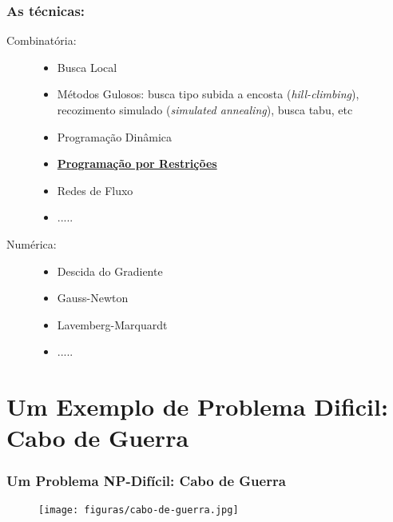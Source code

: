 \documentclass{beamer}
\begin{document}
\begin{frame}[fragile]
 \frametitle{As técnicas:} 
  
\begin{block}{}
      \begin{description}
      \item[Combinatória:]
      \begin{itemize}
           \item Busca Local
          \item Métodos Gulosos: busca tipo subida a encosta (\textit{hill-climbing}), recozimento simulado (\textit{simulated annealing}), busca tabu, etc
        \item Programação Dinâmica
        \item \underline{\textbf{Programação por Restrições}}
        \item Redes de Fluxo
        \item .....        
        \end{itemize}      
      
      \item[Numérica:]
        \begin{itemize}
        \item Descida do Gradiente 
        \item Gauss-Newton
        \item Lavemberg-Marquardt
        \item .....
      \end{itemize}      
       
    \end{description}
  \end{block}
\end{frame}

\section{Um Exemplo de Problema Dificil: Cabo de Guerra}

\begin{frame}
\frametitle{Um Problema NP-Difícil: Cabo de Guerra}

\begin{figure}[ht!]
 \centering
 \texttt{[image: figuras/cabo-de-guerra.jpg]}
\end{figure}


\end{frame}
\end{document}
